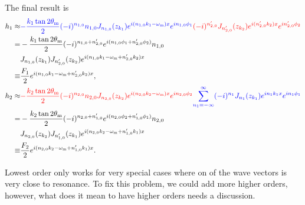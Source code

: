 The final result is
\begin{align}
   h_1 \approx & {\color{blue}-\frac{k_1 \tan 2\theta_\mathrm m}{2} (-i)^{n_{1,0}} n_{1,0} J_{n_{1,0}} (z_{k_1}) e^{i (n_{1,0} k_1-\omega_\mathrm m)x} e^{i n_{1,0}\phi_1} } {\color{red} (-i)^{n'_{2,0}} J_{n'_{2,0}}(z_{k_2}) e^{i(n'_{2,0}k_2)x} e^{i n'_{2,0} \phi_2}  } \nonumber \\
   =& -\frac{k_1 \tan 2\theta_\mathrm m}{2} (-i)^{ n_{1,0}+n'_{2,0} }   e^{i (n_{1,0}\phi_1 + n'_{2,0} \phi_2)} n_{1,0} \nonumber\\
   &J_{n_{1,0}} (z_{k_1})  J_{n'_{2,0}}(z_{k_2}) e^{i(n_{1,0} k_1-\omega_\mathrm m + n'_{2,0}k_2)x}  \\
   \equiv & \frac{F_1}{2} e^{i(n_{1,0} k_1-\omega_\mathrm m + n'_{2,0}k_2)x}  , \\
   h_2 \approx & {\color{red} - \frac{k_2\tan 2\theta_\mathrm m}{2} (-i)^{n_{2,0}} n_{2,0} J_{n_{2,0}}(z_{k_2}) e^{i(n_{2,0}k_2-\omega_\mathrm m)x} e^{i n_{2,0} \phi_2}  }{\color{blue} \sum_{n_1=-\infty}^{\infty} (-i)^{n_1} J_{n_1}(z_{k_1}) e^{in_1 k_1 x} e^{i n_1 \phi_1} } \nonumber \\
   =& - \frac{k_2\tan 2\theta_\mathrm m}{2} (-i)^{n_{2,0}+ n'_{1,0} }   e^{i (n_{2,0} \phi_2 + n'_{1,0} \phi_1)}  n_{2,0} \nonumber\\
   &J_{n_{2,0}}(z_{k_2})  J_{n'_{1,0}}(z_{k_1})  e^{i(n_{2,0}k_2-\omega_\mathrm m+ n'_{1,0} k_1)x} \\
   \equiv & \frac{F_2}{2} e^{i(n_{2,0}k_2-\omega_\mathrm m+ n'_{1,0} k_1)x} .
\end{align}


Lowest order only works for very special cases where on of the wave vectors is very close to resonance. To fix this problem, we could add more higher orders, however, what does it mean to have higher orders needs a discussion.


